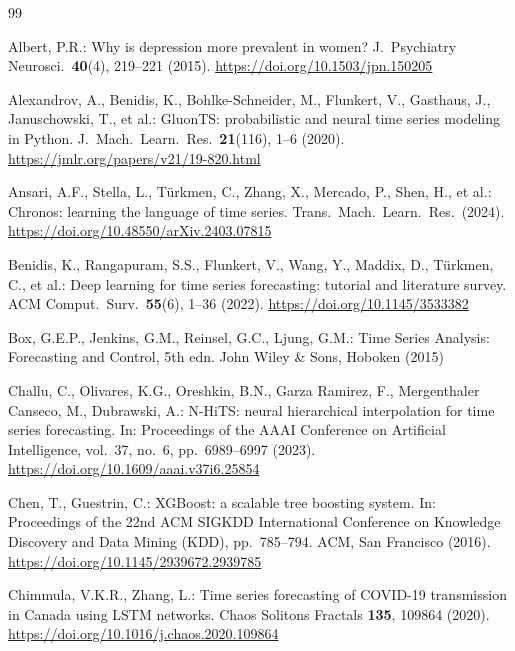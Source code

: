 \documentclass[runningheads]{llncs}
\begin{document}
\begin{thebibliography}{99}

Albert, P.R.: Why is depression more prevalent in women?
J.\ Psychiatry Neurosci.\ \textbf{40}(4), 219--221 (2015).
\url{https://doi.org/10.1503/jpn.150205}

Alexandrov, A., Benidis, K., Bohlke-Schneider, M., Flunkert, V.,
Gasthaus, J., Januschowski, T., et al.: GluonTS: probabilistic and
neural time series modeling in Python. J.\ Mach.\ Learn.\ Res.\
\textbf{21}(116), 1--6 (2020).
\url{https://jmlr.org/papers/v21/19-820.html}

Ansari, A.F., Stella, L., T\"urkmen, C., Zhang, X., Mercado, P., Shen,
H., et al.: Chronos: learning the language of time series. Trans.\ Mach.\
Learn.\ Res.\ (2024). \url{https://doi.org/10.48550/arXiv.2403.07815}

\bibitem{benidis2022}
Benidis, K., Rangapuram, S.S., Flunkert, V., Wang, Y., Maddix, D.,
T\"urkmen, C., et al.: Deep learning for time series forecasting:
tutorial and literature survey. ACM Comput.\ Surv.\ \textbf{55}(6),
1--36 (2022). \url{https://doi.org/10.1145/3533382}

Box, G.E.P., Jenkins, G.M., Reinsel, G.C., Ljung, G.M.: Time Series
Analysis: Forecasting and Control, 5th edn. John Wiley \& Sons,
Hoboken (2015)

Challu, C., Olivares, K.G., Oreshkin, B.N., Garza Ramirez, F.,
Mergenthaler Canseco, M., Dubrawski, A.: N-HiTS: neural hierarchical
interpolation for time series forecasting. In: Proceedings of the AAAI
Conference on Artificial Intelligence, vol.~37, no.~6, pp.~6989--6997
(2023). \url{https://doi.org/10.1609/aaai.v37i6.25854}

Chen, T., Guestrin, C.: XGBoost: a scalable tree boosting system. In:
Proceedings of the 22nd ACM SIGKDD International Conference on
Knowledge Discovery and Data Mining (KDD), pp.~785--794. ACM,
San Francisco (2016). \url{https://doi.org/10.1145/2939672.2939785}

\bibitem{chimmula2020}
Chimmula, V.K.R., Zhang, L.: Time series forecasting of COVID-19
transmission in Canada using LSTM networks. Chaos Solitons Fractals
\textbf{135}, 109864 (2020).
\url{https://doi.org/10.1016/j.chaos.2020.109864}


\end{thebibliography}
\end{document}
